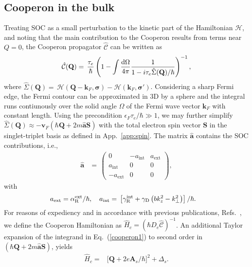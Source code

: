 \documentclass[superscriptaddress,noshowpacs,noshowkeys, twocolumn, floatfix,aps, prb,reprint]{revtex4-1}
\begin{document}
\subsection{Cooperon in the bulk}\label{sec:BulkCooperon}
%
Treating SOC as a small perturbation to the kinetic part of the Hamiltonian $\mathcal{H}$, and noting that the main contribution to the Cooperon results from terms near $Q=0$, the Cooperon propagator $\hat{\mathcal{C}}$ can be written as 
%
\begin{equation}
\hat{\mathcal{C}}(\mathbf{Q})=\,\frac{\tau_e}{\hbar}\left(1-\int\frac{{\rm d}\Omega}{4\pi}\frac{1}{1-i\tau_e\hat{\Sigma}(\mathbf{Q})/\hbar}
\right)^{-1},
\label{cooperon1}
\end{equation}
%
where $\hat{\Sigma}(\mathbf{Q})=\,\mathcal{H}(\mathbf{Q}-\mathbf{k}_F,\boldsymbol{\sigma})-\mathcal{H}(\mathbf{k}_F,\boldsymbol{\sigma'})$.
Considering a sharp Fermi edge, the Fermi contour can be approximated in 3D by a sphere and the integral runs contiunously over the solid angle $\Omega$ of the Fermi wave vector $\mathbf{k}_F$ with constant length. 
Using the precondition  $\epsilon_F \tau_e/\hbar\gg 1$,
we may further simplify  $\hat{\Sigma}(\mathbf{Q})\approx -\mathbf{v}_F(\hbar\mathbf{Q}+2m\mathbf{\hat{a}}\mathbf{S}) $ with the total electron spin vector $\boldsymbol{S}$ in the singlet-triplet basis
as defined in App.~\ref{app:spin}. The matrix $\mathbf{\hat{a}}$ contains the SOC contributions, i.e.,
%
\begin{align}
\mathbf{\hat{a}}&=\,
\begin{pmatrix}
0&-a_\text{int}&a_\text{ext}\\
a_\text{int}&0&0\\
-a_\text{ext}&0&0
\end{pmatrix},
\end{align}
%
with 
%
\begin{align}
a_\text{ext}={}&\alpha_\text{R}^\text{ext}/\hbar,\quad
a_\text{int}={}\left[\gamma_\text{R}^\text{int}+\gamma_\text{D}\left(bk_z^2-k_\perp^2\right)\right]/\hbar\notag. 
\end{align}
%
For reasons of expediency and in accordance with previous publications, Refs.~, we define the Cooperon Hamiltonian as $\hat{H}_c=(\hbar D_e \hat{\mathcal{C}})^{-1}$. 
An additional Taylor expansion of the integrand in Eq.~(\ref{cooperon1}) to second order in $(\hbar\mathbf{Q}+2m\mathbf{\hat{a}}\mathbf{S})$, yields 
%
\begin{align}
\hat{H}_c={}&\Big[\mathbf{Q}+2 e \mathbf{A}_s/\hbar\Big]^2+\Delta_s.
\label{eq:Hcbulk}
\end{align}
\end{document}
